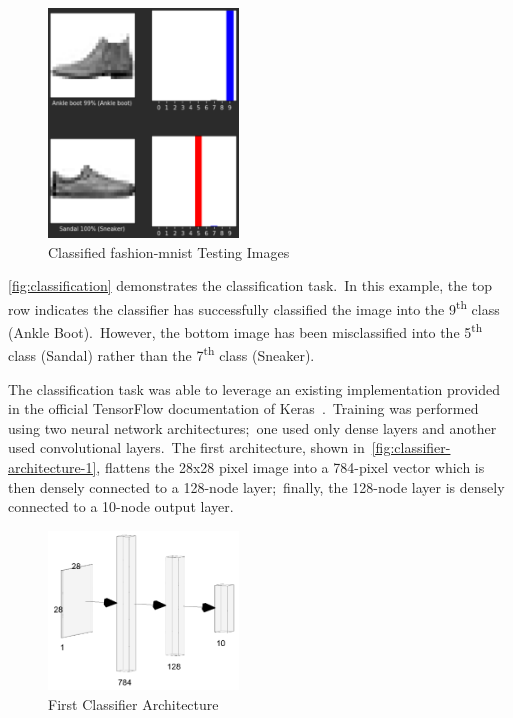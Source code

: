 \documentclass[conference]{IEEEtran}
\begin{document}
    \begin{figure}
        \caption{Classified fashion-mnist Testing Images}
        \label{fig:classification}
        \begin{center}
            \includegraphics[width=0.45\textwidth]{classification.png}
        \end{center}
    \end{figure}

    \autoref{fig:classification} demonstrates the classification task.\ In this example, the top row indicates the classifier has successfully classified the image into the 9\textsuperscript{th} class (Ankle Boot).\ However, the bottom image has been misclassified into the 5\textsuperscript{th} class (Sandal) rather than the 7\textsuperscript{th} class (Sneaker).

    The classification task was able to leverage an existing implementation provided in the official TensorFlow documentation of Keras~\cite{basic-classification-classify-images-of-clothing}.\ Training was performed using two neural network architectures;\ one used only dense layers and another used convolutional layers.\ The first architecture, shown in~\autoref{fig:classifier-architecture-1}, flattens the 28x28 pixel image into a 784-pixel vector which is then densely connected to a 128-node layer;\ finally, the 128-node layer is densely connected to a 10-node output layer.

    \begin{figure}
        \caption{First Classifier Architecture}
        \label{fig:classifier-architecture-1}
        \begin{center}
            \includegraphics[width=0.45\textwidth]{First_Classifier_Architecture.png}
        \end{center}
    \end{figure}
\end{document}
